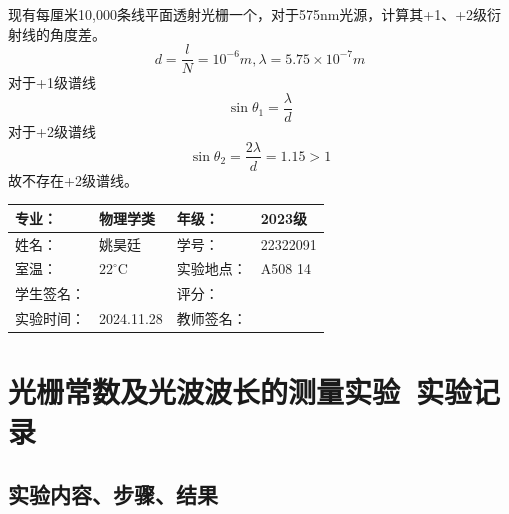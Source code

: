\documentclass[dvipsnames, svgnames,a4paper,11pt]{article}
\begin{document}
\begin{question}
	现有每厘米10,000条线平面透射光栅一个，对于575nm光源，计算其+1、+2级衍射线的角度差。
	\tcblower
	$$d=\frac{l}{N}=10^{-6}m,\lambda=5.75\times10^{-7}m$$
    对于+1级谱线
    $$\sin\theta_1=\frac{\lambda}{d}$$
    对于+2级谱线
    $$\sin\theta_2=\frac{2\lambda}{d}=1.15>1$$
    故不存在+2级谱线。
\end{question}


\clearpage
{}
\begin{table}
	\renewcommand\arraystretch{1.7}
	\centering
	\begin{tabularx}{\textwidth}{|X|X|X|X|}
	\hline
	专业：& 物理学类 &年级：& 2023级 \\
	\hline
	姓名： &姚昊廷& 学号：&22322091  \\
	\hline
	室温：&$22^\circ$C&实验地点：&A508  14\\
	\hline
	学生签名：& & 评分： &\\
	\hline
	实验时间：& 2024.11.28& 教师签名：&\\
	\hline
	\end{tabularx}
\end{table}
\section{光栅常数及光波波长的测量实验\ \textbf{实验记录}}
\subsection{实验内容、步骤、结果}
\end{document}
